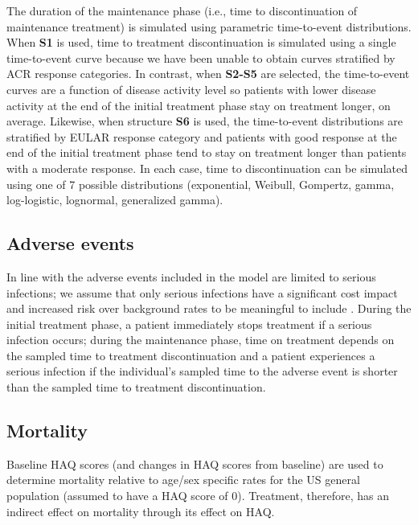 \documentclass[11pt,final,fleqn]{article}\usepackage[]{graphicx}\usepackage[]{color}
\theoremstyle{plain}
\begin{document}
The duration of the maintenance phase (i.e., time to discontinuation of maintenance treatment) is simulated using parametric time-to-event distributions. When \textbf{S1} is used, time to treatment discontinuation is simulated using a single time-to-event curve because we have been unable to obtain curves stratified by ACR response categories. In contrast, when \textbf{S2-S5} are selected, the time-to-event curves are a function of disease activity level so patients with lower disease activity at the end of the initial treatment phase stay on treatment longer, on average. Likewise, when structure \textbf{S6} is used, the time-to-event distributions are stratified by EULAR response category and patients with good response at the end of the initial treatment phase tend to stay on treatment longer than patients with a moderate response. In each case, time to discontinuation can be simulated using one of 7 possible distributions (exponential, Weibull, Gompertz, gamma, log-logistic, lognormal, generalized gamma).

\subsection{Adverse events}
In line with \citet{stevenson2016adalimumab} the adverse events included in the model are limited to serious infections; we assume that only serious infections have a significant cost impact and increased risk over background rates to be meaningful to include \citep{ramiro2017safety}. During the initial treatment phase, a patient immediately stops treatment if a serious infection occurs; during the maintenance phase, time on treatment depends on the sampled time to treatment discontinuation and a patient experiences a serious infection if the individual's sampled time to the adverse event is shorter than the sampled time to treatment discontinuation. 

\subsection{Mortality}
Baseline HAQ scores (and changes in HAQ scores from baseline) are used to determine mortality relative to age/sex specific rates for the US general population (assumed to have a HAQ score of 0). Treatment, therefore, has an indirect effect on mortality through its effect on HAQ. 
\end{document}
